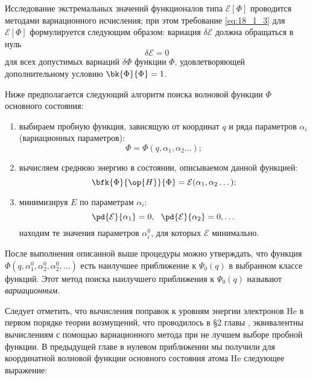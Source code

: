 
Исследование экстремальных значений функционалов типа $\mathcal{E}[\Phi]$ проводится методами вариационного исчисления; при этом требование \eqref{eq:18_1_3} для $\mathcal{E}[\Phi]$ формулируется следующим образом: вариация $\delta \mathcal{E}$ должна обращаться в нуль
\begin{equation}
\label{eq:18_1_4}
\delta \mathcal{E} = 0
\end{equation}
для всех допустимых вариаций $\delta\Phi$ функции $\Phi$, удовлетворяющей дополнительному условию $\bk{\Phi}{\Phi} = 1$.

Ниже предполагается следующий алгоритм поиска волновой функции $\Phi$ основного состояния:
\begin{enumerate}
\item выбираем пробную функция, зависящую от координат $q$ и ряда параметров $\alpha_i$ (вариационных параметров):
$$
\Phi = \Phi(q, \alpha_1, \alpha_2 \dots );
$$
\item вычисляем среднюю энергию в состоянии, описываемом данной функцией:
$$
\bfk{\Phi}{\op{H}}{\Phi} = \mathcal{E}(\alpha_1, \alpha_2 \dots);
$$
\item минимизируя $E$ по параметрам $\alpha_i$:
$$
\pd{\mathcal{E}}{\alpha_1} = 0,~~ \pd{\mathcal{E}}{\alpha_2} = 0, \dots
$$
находим те значения параметров $\alpha_i^0$, для которых $\mathcal{E}$ минимально.
\end{enumerate}

После выполнения описанной выше процедуры можно утверждать, что функция $\Phi(q, \alpha_1^0, \alpha_2^0, \alpha_2^0, \dots)$ есть наилучшее приближение к $\Psi_0(q)$ в выбранном классе функций. Этот метод поиска наилучшего приближения к $\Psi_0(q)$ называют {\em вариационным}.

Следует отметить, что вычисления поправок к уровням энергии электронов He в первом порядке теории возмущений, что проводилось в \S 2 главы , эквивалентны вычислениям с помощью вариационного метода при не лучшем выборе пробной функции. В предыдущей главе в нулевом приближении мы получили для координатной волновой функции основного состояния атома He следующее выражение:

